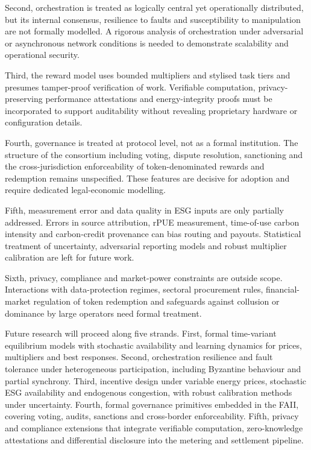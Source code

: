 \documentclass[oneside,10pt]{swissi}
\begin{document}
Second, orchestration is treated as logically central yet operationally distributed, but its internal consensus, resilience to faults and susceptibility to manipulation are not formally modelled. A rigorous analysis of orchestration under adversarial or asynchronous network conditions is needed to demonstrate scalability and operational security.

Third, the reward model uses bounded multipliers and stylised task tiers and presumes tamper-proof verification of work. Verifiable computation, privacy-preserving performance attestations and energy-integrity proofs must be incorporated to support auditability without revealing proprietary hardware or configuration details.

Fourth, governance is treated at protocol level, not as a formal institution. The structure of the consortium including voting, dispute resolution, sanctioning and the cross-jurisdiction enforceability of token-denominated rewards and redemption remains unspecified. These features are decisive for adoption and require dedicated legal-economic modelling.

Fifth, measurement error and data quality in ESG inputs are only partially addressed. Errors in source attribution, rPUE measurement, time-of-use carbon intensity and carbon-credit provenance can bias routing and payouts. Statistical treatment of uncertainty, adversarial reporting models and robust multiplier calibration are left for future work.

Sixth, privacy, compliance and market-power constraints are outside scope. Interactions with data-protection regimes, sectoral procurement rules, financial-market regulation of token redemption and safeguards against collusion or dominance by large operators need formal treatment.

Future research will proceed along five strands. First, formal time-variant equilibrium models with stochastic availability and learning dynamics for prices, multipliers and best responses. Second, orchestration resilience and fault tolerance under heterogeneous participation, including Byzantine behaviour and partial synchrony. Third, incentive design under variable energy prices, stochastic ESG availability and endogenous congestion, with robust calibration methods under uncertainty. Fourth, formal governance primitives embedded in the FAII, covering voting, audits, sanctions and cross-border enforceability. Fifth, privacy and compliance extensions that integrate verifiable computation, zero-knowledge attestations and differential disclosure into the metering and settlement pipeline.

\bigskip

\bigskip

\printbibliography

\swDeclarationsPage
\end{document}

